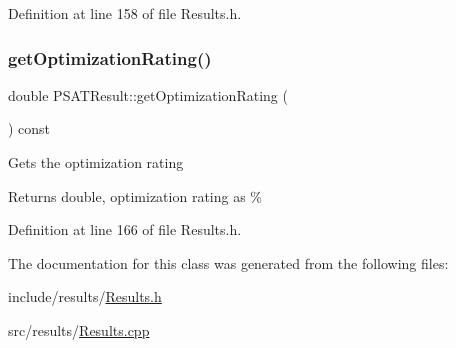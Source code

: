Definition at line 158 of file Results.\+h.

\mbox{\label{class_p_s_a_t_result_aa0a7001461408fcb06a6c22ce2d064db}} 
\subsubsection{\texorpdfstring{get\+Optimization\+Rating()}{getOptimizationRating()}}
{\footnotesize\ttfamily double P\+S\+A\+T\+Result\+::get\+Optimization\+Rating (\begin{DoxyParamCaption}{ }\end{DoxyParamCaption}) const\hspace{0.3cm}{\ttfamily [inline]}}

Gets the optimization rating \begin{DoxyReturn}{Returns}
double, optimization rating as \% 
\end{DoxyReturn}


Definition at line 166 of file Results.\+h.



The documentation for this class was generated from the following files\+:\begin{DoxyCompactItemize}
\item 
include/results/\hyperlink{_results_8h}{Results.\+h}\item 
src/results/\hyperlink{_results_8cpp}{Results.\+cpp}\end{DoxyCompactItemize}
